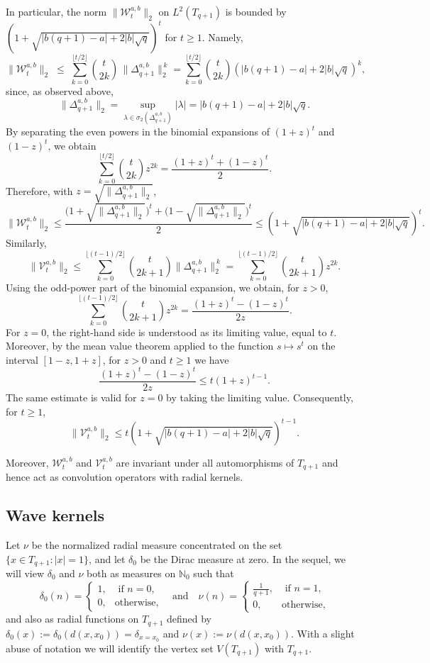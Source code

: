\documentclass[12pt]{amsart}
\numberwithin{equation}{section}
\theoremstyle{boldremark}
\begin{document}
In particular, the norm $\|\mathcal{W}_t^{a,b}\|_{2}$  on $L^{2}(T_{q+1})$ is bounded by $\left(1+\sqrt{|b(q+1)-a|+2|b|\sqrt{q}}\right)^{t}$ for $t\geq 1$. Namely, 
$$
\big\|\mathcal W_t^{a,b}\big\|_{2}
\;\le\;
\sum_{k=0}^{\lfloor t/2\rfloor}\binom{t}{2k}\,\|\Delta_{q+1}^{a,b}\|_{2}^{\,k}= \sum_{k=0}^{\lfloor t/2\rfloor}\binom{t}{2k}\left(|b(q+1)-a|+2|b|\sqrt{q}\right)^k,
$$
since, as observed above,
$$
\|\Delta_{q+1}^{a,b}\|_{2}=\sup_{\lambda\in\sigma_2\left(\Delta_{q+1}^{a,b}\right)}
|\lambda|= |b(q+1)-a|+2|b|\sqrt{q}.
$$
By separating the even powers in the binomial expansions of $(1+z)^t$ and
$(1-z)^t$, we obtain
\[
\sum_{k=0}^{\lfloor t/2\rfloor}\binom{t}{2k}z^{2k}
=
\frac{(1+z)^t+(1-z)^t}{2}.
\]
Therefore, with $z=\sqrt{\|\Delta_{q+1}^{a,b}\|_{2}}$,
\[
\big\|\mathcal W_t^{a,b}\big\|_2
\leq
\frac{
\bigl(1+\sqrt{\|\Delta_{q+1}^{a,b}\|_{2}}\bigr)^t
+
\bigl(1-\sqrt{\|\Delta_{q+1}^{a,b}\|_{2}}\bigr)^t
}{2}
\leq
\left(1+\sqrt{|b(q+1)-a|+2|b|\sqrt{q}}\right)^t .
\]
Similarly,
\[
\big\|\mathcal V_t^{a,b}\big\|_2
\leq
\sum_{k=0}^{\lfloor (t-1)/2\rfloor}
\binom{t}{2k+1}\|\Delta_{q+1}^{a,b}\|_{2}^{\,k}
=
\sum_{k=0}^{\lfloor (t-1)/2\rfloor}
\binom{t}{2k+1}z^{2k}.
\]
Using the odd-power part of the binomial expansion, we obtain, for $z>0$,
\[
\sum_{k=0}^{\lfloor (t-1)/2\rfloor}
\binom{t}{2k+1}z^{2k}
=
\frac{(1+z)^t-(1-z)^t}{2z}.
\]
For $z=0$, the right-hand side is understood as its limiting value, equal to $t$.
Moreover, by the mean value theorem applied to the function $s\mapsto s^t$
on the interval $[1-z,1+z]$, for $z>0$ and $t\geq1$ we have
\[
\frac{(1+z)^t-(1-z)^t}{2z}
\leq
t(1+z)^{t-1}.
\]
The same estimate is valid for $z=0$ by taking the limiting value.
Consequently, for $t\geq1$,
\[
\big\|\mathcal V_t^{a,b}\big\|_2
\leq
t\left(1+\sqrt{|b(q+1)-a|+2|b|\sqrt{q}}\right)^{t-1}.
\]

Moreover,  $\mathcal{W}_t^{a,b}$  and $\mathcal{V}_t^{a,b}$ are invariant under all automorphisms of $T_{q+1}$ and hence act as convolution operators with radial kernels.

\subsection{Wave kernels}
Let $\nu$ be the normalized radial measure concentrated on the set $\{x \in T_{q+1} : |x| = 1\}$, and let $\delta_0$ be the Dirac measure at zero. In the sequel, we will view $\delta_0$ and $\nu$ both as measures on $\mathbb{N}_0$ such that
$$
\delta_0(n)=\left\{
              \begin{array}{ll}
                1, & \text{  if  } n=0, \\
                0, & \text{otherwise},
              \end{array}
            \right. \quad \text{and} \quad
\nu(n)=\left\{
              \begin{array}{ll}
                \frac{1}{q+1}, & \text{  if  } n=1, \\
                0, & \text{otherwise},
              \end{array} \right.
$$
and also as radial functions on $T_{q+1}$ defined by $\delta_0(x):=\delta_0(d(x,x_0))=\delta_{x=x_0}$ and $\nu(x):=\nu(d(x,x_0))$. With a slight abuse of notation we will identify the vertex set $V(T_{q+1})$ with $T_{q+1}$.
\end{document}
